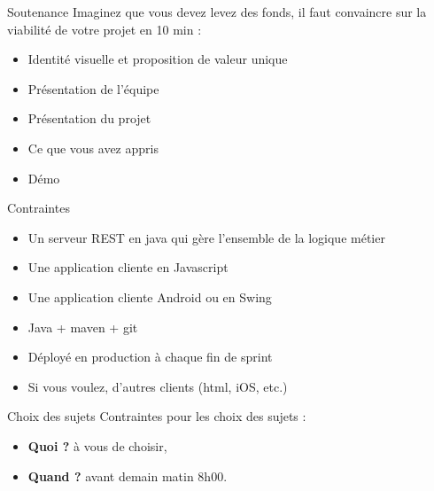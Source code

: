 \documentclass{beamer}
\begin{document}
\begin{frame}{Soutenance}
  Imaginez que vous devez levez des fonds, il faut convaincre sur la viabilité de votre projet en 10 min :
  \begin{itemize}
    \item Identité visuelle et proposition de valeur unique
    \item Présentation de l'équipe
    \item Présentation du projet
    \item Ce que vous avez appris
    \item Démo
  \end{itemize}

\end{frame}

\begin{frame}{Contraintes}
  \begin{itemize}
    \item Un serveur REST en java qui gère l'ensemble de la logique métier
    \item Une application cliente en Javascript
    \item Une application cliente Android ou en Swing
    \item Java + maven + git
    \item Déployé en production à chaque fin de sprint
    \item Si vous voulez, d'autres clients (html, iOS, etc.)
  \end{itemize}
\end{frame}

\begin{frame}{Choix des sujets}
  Contraintes pour les choix des sujets : 
  \begin{itemize}
    \item \textbf{Quoi ?} à vous de choisir,
    \item \textbf{Quand ?} avant demain matin 8h00.
  \end{itemize}
\end{frame}
\end{document}
